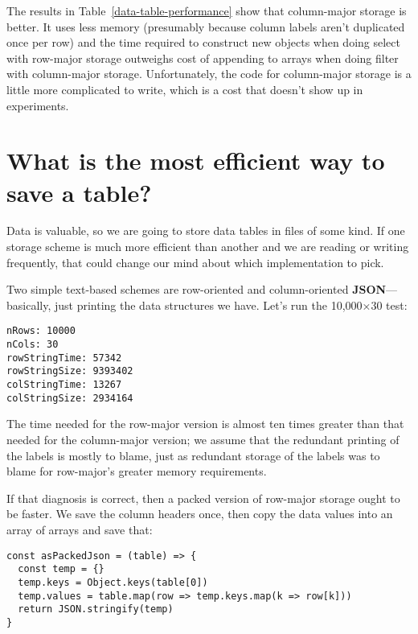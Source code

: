 \documentclass[krantzl]{krantz}
\newcommand{\tblref}[1]{Table~\ref{#1}}
\newcommand{\glossref}[1]{\textbf{#1}}
\begin{document}
The results in \tblref{data-table-performance} show that column-major storage is better.
It uses less memory (presumably because column labels aren't duplicated once per row)
and the time required to construct new objects when doing select with row-major storage
outweighs cost of appending to arrays when doing filter with column-major storage.
Unfortunately,
the code for column-major storage is a little more complicated to write,
which is a cost that doesn't show up in experiments.

\section{What is the most efficient way to save a table?}\label{data-table-save}


Data is valuable,
so we are going to store data tables in files of some kind.
If one storage scheme is much more efficient than another and we are reading or writing frequently,
that could change our mind about which implementation to pick.


Two simple text-based schemes are row-oriented and column-oriented \glossref{JSON}---basically,
just printing the data structures we have.
Let's run the 10,000×30 test:


\begin{lstlisting}[frame=single,frameround=tttt]
nRows: 10000
nCols: 30
rowStringTime: 57342
rowStringSize: 9393402
colStringTime: 13267
colStringSize: 2934164
\end{lstlisting}



The time needed for the row-major version is almost ten times greater than
that needed for the column-major version;
we assume that the redundant printing of the labels is mostly to blame,
just as redundant storage of the labels was to blame for row-major's greater memory requirements.


If that diagnosis is correct,
then a packed version of row-major storage ought to be faster.
We save the column headers once,
then copy the data values into an array of arrays and save that:


\begin{lstlisting}[frame=single,frameround=tttt]
const asPackedJson = (table) => {
  const temp = {}
  temp.keys = Object.keys(table[0])
  temp.values = table.map(row => temp.keys.map(k => row[k]))
  return JSON.stringify(temp)
}
\end{lstlisting}
\end{document}
